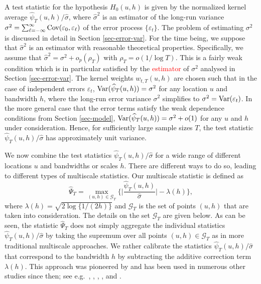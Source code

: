 A test statistic for the hypothesis $H_0(u,h)$ is given by the normalized kernel average $\widehat{\psi}_T(u,h)/\widehat{\sigma}$, where $\widehat{\sigma}^2$ is an estimator of the long-run variance $\sigma^2 = \sum\nolimits_{\ell=-\infty}^{\infty} \textnormal{Cov}(\varepsilon_0,\varepsilon_\ell)$ of the error process $\{\varepsilon_t\}$. The problem of estimating $\sigma^2$ is discussed in detail in Section \ref{sec-error-var}. For the time being, we suppose that $\widehat{\sigma}^2$ is an estimator with reasonable theoretical properties. Specifically, we assume that $\widehat{\sigma}^2 = \sigma^2 + o_p(\rho_T)$ with $\rho_T = o(1/\log T)$. This is a fairly weak condition which is in particular satisfied by the \textcolor{red}{estimator} of $\sigma^2$ analysed in Section \ref{sec-error-var}. The kernel weights $w_{t,T}(u,h)$ are chosen such that in the case of independent errors $\varepsilon_t$, $\textnormal{Var}(\widehat{\psi}_T(u,h)) = \sigma^2$ for any location $u$ and bandwidth $h$, where the long-run error variance $\sigma^2$ simplifies to $\sigma^2 = \textnormal{Var}(\varepsilon_t)$. In the more general case that the error terms satisfy the weak dependence conditions from Section \ref{sec-model}, $\textnormal{Var}(\widehat{\psi}_T(u,h)) = \sigma^2 + o(1)$ for any $u$ and $h$ under consideration. Hence, for sufficiently large sample sizes $T$, the test statistic $\widehat{\psi}_T(u,h)/\widehat{\sigma}$ has approximately unit variance.


We now combine the test statistics $\widehat{\psi}_T(u,h)/\widehat{\sigma}$ for a wide range of different locations $u$ and bandwidths or scales $h$. There are different ways to do so, leading to different types of multiscale statistics. Our multiscale statistic is defined as
\begin{equation}\label{multiscale-stat}
\widehat{\Psi}_T = \max_{(u,h) \in \mathcal{G}_T} \Big\{ \Big|\frac{\widehat{\psi}_T(u,h)}{\widehat{\sigma}}\Big| - \lambda(h) \Big\}, 
\end{equation} 
where $\lambda(h) = \sqrt{2 \log \{ 1/(2h) \}}$ and $\mathcal{G}_T$ is the set of points $(u,h)$ that are taken into consideration. The details on the set $\mathcal{G}_T$ are given below. As can be seen, the statistic $\widehat{\Psi}_T$ does not simply aggregate the individual statistics $\widehat{\psi}_T(u,h)/\widehat{\sigma}$ by taking the supremum over all points $(u,h) \in \mathcal{G}_T$ as in more traditional multiscale approaches. We rather calibrate the statistics $\widehat{\psi}_T(u,h)/\widehat{\sigma}$ that correspond to the bandwidth $h$ by subtracting the additive correction term $\lambda(h)$. This approach was pioneered by \cite{DuembgenSpokoiny2001} and has been used in numerous other studies since then; see e.g.\ \cite{Duembgen2002}, \cite{Rohde2008}, \cite{DuembgenWalther2008}, \cite{RufibachWalther2010}, \cite{SchmidtHieber2013} and \cite{EckleBissantzDette2017}. 


